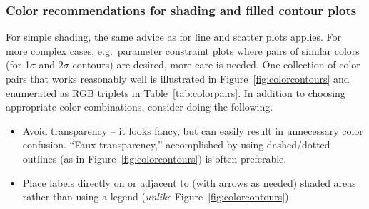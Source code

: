 \documentclass[letterpaper,11pt]{article}
\begin{document}
\subsubsection{Color recommendations for shading and filled contour plots}

For simple shading, the same advice as for line and scatter plots applies. For more complex cases, e.g.\ parameter constraint plots where pairs of similar colors (for 1$\sigma$ and $2\sigma$ contours) are desired, more care is needed. One collection of color pairs that works reasonably well is illustrated in Figure~\ref{fig:colorcontours} and enumerated as RGB triplets in Table~\ref{tab:colorpairs}. In addition to choosing appropriate color combinations, consider doing the following.
\begin{itemize}
\item Avoid transparency -- it looks fancy, but can easily result in unnecessary color confusion. ``Faux transparency,'' accomplished by using dashed/dotted outlines (as in Figure~\ref{fig:colorcontours}) is often preferable.
\item Place labels directly on or adjacent to (with arrows as needed) shaded areas rather than using a legend (\emph{unlike} Figure~\ref{fig:colorcontours}).
\end{itemize}
\end{document}

